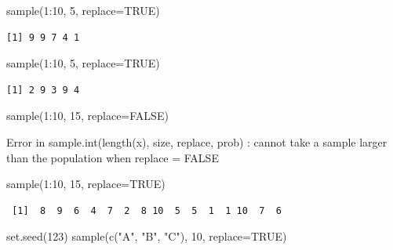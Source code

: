 \documentclass[
  letterpaper,
  DIV=11,
  numbers=noendperiod]{scrreprt}
\newenvironment{Shaded}{\begin{snugshade}}{\end{snugshade}}
\newcommand{\AttributeTok}[1]{\textcolor[rgb]{0.40,0.45,0.13}{#1}}
\newcommand{\ConstantTok}[1]{\textcolor[rgb]{0.56,0.35,0.01}{#1}}
\newcommand{\DecValTok}[1]{\textcolor[rgb]{0.68,0.00,0.00}{#1}}
\newcommand{\FunctionTok}[1]{\textcolor[rgb]{0.28,0.35,0.67}{#1}}
\newcommand{\NormalTok}[1]{\textcolor[rgb]{0.00,0.23,0.31}{#1}}
\newcommand{\SpecialCharTok}[1]{\textcolor[rgb]{0.37,0.37,0.37}{#1}}
\newcommand{\StringTok}[1]{\textcolor[rgb]{0.13,0.47,0.30}{#1}}
\begin{document}
\begin{Shaded}
\begin{Highlighting}[]
\FunctionTok{sample}\NormalTok{(}\DecValTok{1}\SpecialCharTok{:}\DecValTok{10}\NormalTok{, }\DecValTok{5}\NormalTok{, }\AttributeTok{replace=}\ConstantTok{TRUE}\NormalTok{)}
\end{Highlighting}
\end{Shaded}

\begin{verbatim}
[1] 9 9 7 4 1
\end{verbatim}

\begin{Shaded}
\begin{Highlighting}[]
\FunctionTok{sample}\NormalTok{(}\DecValTok{1}\SpecialCharTok{:}\DecValTok{10}\NormalTok{, }\DecValTok{5}\NormalTok{, }\AttributeTok{replace=}\ConstantTok{TRUE}\NormalTok{)}
\end{Highlighting}
\end{Shaded}

\begin{verbatim}
[1] 2 9 3 9 4
\end{verbatim}

\begin{Shaded}
\begin{Highlighting}[]
\FunctionTok{sample}\NormalTok{(}\DecValTok{1}\SpecialCharTok{:}\DecValTok{10}\NormalTok{, }\DecValTok{15}\NormalTok{, }\AttributeTok{replace=}\ConstantTok{FALSE}\NormalTok{)}
\end{Highlighting}
\end{Shaded}

{Error in sample.int(length(x), size, replace, prob) : cannot take a
sample larger than the population when \textquotesingle replace =
FALSE\textquotesingle{}}

\begin{Shaded}
\begin{Highlighting}[]
\FunctionTok{sample}\NormalTok{(}\DecValTok{1}\SpecialCharTok{:}\DecValTok{10}\NormalTok{, }\DecValTok{15}\NormalTok{, }\AttributeTok{replace=}\ConstantTok{TRUE}\NormalTok{)}
\end{Highlighting}
\end{Shaded}

\begin{verbatim}
 [1]  8  9  6  4  7  2  8 10  5  5  1  1 10  7  6
\end{verbatim}

\begin{Shaded}
\begin{Highlighting}[]
\FunctionTok{set.seed}\NormalTok{(}\DecValTok{123}\NormalTok{)}
\FunctionTok{sample}\NormalTok{(}\FunctionTok{c}\NormalTok{(}\StringTok{"A"}\NormalTok{, }\StringTok{"B"}\NormalTok{, }\StringTok{"C"}\NormalTok{), }\DecValTok{10}\NormalTok{, }\AttributeTok{replace=}\ConstantTok{TRUE}\NormalTok{)}
\end{Highlighting}
\end{Shaded}
\end{document}
